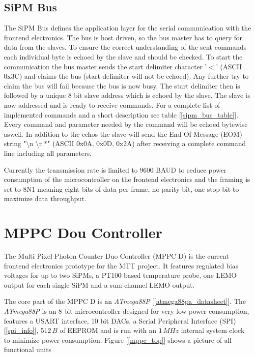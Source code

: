 \documentclass[a4paper, 12pt]{article}
\begin{document}
	\newpage
	\subsection{SiPM Bus}

The SiPM Bus defines the application layer for the serial communication with the frontend electronics. The bus is host driven, so the bus master has to query for data from the slaves.
To ensure the correct understanding of the sent commands each individual byte is echoed by the slave and should be checked. To start the communication the bus master sends the start
delimiter character '$<$' (ASCII 0x3C) and claims the bus (start delimiter will not be echoed). Any further try to claim the bus will fail because the bus is now busy. 
The start delimiter then is followed by a unique 8 bit slave address which is echoed by the slave. The slave is now addressed and is ready to receive commands. For a complete list of
implemented commands and a short description see table [\ref{sipm_bus_table}]. Every command and parameter needed by the command will be echoed bytewise aswell. In addition to the echos 
the slave will send the End Of Message (EOM) string "\textbackslash n \textbackslash r *" (ASCII 0x0A, 0x0D, 0x2A) after receiving a complete command line including all parameters.

Currently the transmission rate is limited to 9600 BAUD to reduce power consumption of the microcontroller on the frontend electronics and the framing is set to 8N1 meaning eight bits of data per frame,
no parity bit, one stop bit to maximize data throughput.

	\newpage
	\section{MPPC Dou Controller}

The Multi Pixel Photon Counter Duo Controller (MPPC D) is the current frontend electronics prototype for the MTT project. It features regulated bias voltages for up to two SiPMs, a PT100 based temperature
probe, one LEMO output for each single SiPM and a sum channel LEMO output.

The core part of the MPPC D is an \emph{ATmega88P} [\ref{atmega88pa_datasheet}]. The \emph{ATmega88P} is an 8 bit microcontroller designed for very low power consumption, features a USART interface,
10 bit DACs, a Serial Peripheral Interface (SPI) [\ref{spi_info}], $512\,B$ of EEPROM and is run with an $1\,MHz$ internal system clock to minimize power consumption. Figure [\ref{mppc_top}] shows a picture
of all functional units 
\end{document}
